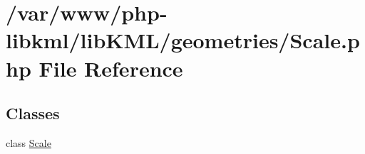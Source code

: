 \hypertarget{Scale_8php}{
\section{/var/www/php-\/libkml/libKML/geometries/Scale.php File Reference}
\label{dd/d04/Scale_8php}
}
\subsection*{Classes}
\begin{DoxyCompactItemize}
\item 
class \hyperlink{classScale}{Scale}
\end{DoxyCompactItemize}
